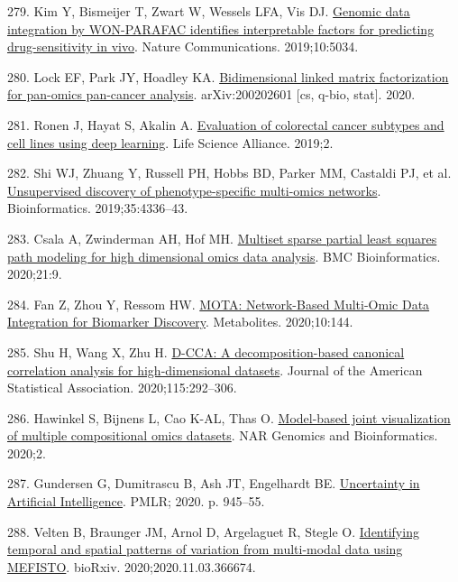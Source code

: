 \documentclass[
  12pt,
  a4paper,
  twoside,
  openright]{book}
\newlength{\cslhangindent}
\newlength{\cslentryspacingunit} %
\newenvironment{CSLReferences}[2] %
 {%
  \setlength{\parindent}{0pt}
  \ifodd #1
  \let\oldpar\par
  \def\par{\hangindent=\cslhangindent\oldpar}
  \fi
  \setlength{\parskip}{#2\cslentryspacingunit}
 }%
 {}
\begin{document}
\begin{CSLReferences}{0}{0}
\leavevmode{}%
279. Kim Y, Bismeijer T, Zwart W, Wessels LFA, Vis DJ. \href{https://doi.org/10.1038/s41467-019-13027-2}{Genomic data integration by WON-PARAFAC identifies interpretable factors for predicting drug-sensitivity in vivo}. Nature Communications. 2019;10:5034.

\leavevmode{}%
280. Lock EF, Park JY, Hoadley KA. \href{http://arxiv.org/abs/2002.02601}{Bidimensional linked matrix factorization for pan-omics pan-cancer analysis}. arXiv:200202601 {[}cs, q-bio, stat{]}. 2020.

\leavevmode{}%
281. Ronen J, Hayat S, Akalin A. \href{https://doi.org/10.26508/lsa.201900517}{Evaluation of colorectal cancer subtypes and cell lines using deep learning}. Life Science Alliance. 2019;2.

\leavevmode{}%
282. Shi WJ, Zhuang Y, Russell PH, Hobbs BD, Parker MM, Castaldi PJ, et al. \href{https://doi.org/10.1093/bioinformatics/btz226}{Unsupervised discovery of phenotype-specific multi-omics networks}. Bioinformatics. 2019;35:4336--43.

\leavevmode{}%
283. Csala A, Zwinderman AH, Hof MH. \href{https://doi.org/10.1186/s12859-019-3286-3}{Multiset sparse partial least squares path modeling for high dimensional omics data analysis}. BMC Bioinformatics. 2020;21:9.

\leavevmode{}%
284. Fan Z, Zhou Y, Ressom HW. \href{https://doi.org/10.3390/metabo10040144}{MOTA: Network-Based Multi-Omic Data Integration for Biomarker Discovery}. Metabolites. 2020;10:144.

\leavevmode{}%
285. Shu H, Wang X, Zhu H. \href{https://doi.org/10.1080/01621459.2018.1543599}{D-CCA: A decomposition-based canonical correlation analysis for high-dimensional datasets}. Journal of the American Statistical Association. 2020;115:292--306.

\leavevmode{}%
286. Hawinkel S, Bijnens L, Cao K-AL, Thas O. \href{https://doi.org/10.1093/nargab/lqaa050}{Model-based joint visualization of multiple compositional omics datasets}. NAR Genomics and Bioinformatics. 2020;2.

\leavevmode{}%
287. Gundersen G, Dumitrascu B, Ash JT, Engelhardt BE. \href{https://proceedings.mlr.press/v115/gundersen20a.html}{Uncertainty in Artificial Intelligence}. PMLR; 2020. p. 945--55.

\leavevmode{}%
288. Velten B, Braunger JM, Arnol D, Argelaguet R, Stegle O. \href{https://doi.org/10.1101/2020.11.03.366674}{Identifying temporal and spatial patterns of variation from multi-modal data using MEFISTO}. bioRxiv. 2020;2020.11.03.366674.

\end{CSLReferences}
\end{document}
